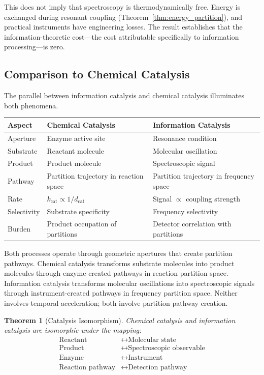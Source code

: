 \documentclass[twocolumn,10pt,a4paper]{article}
\newtheorem{theorem}{Theorem}[section]
\theoremstyle{definition}
\theoremstyle{remark}
\newcommand{\dcat}{d_{\mathrm{cat}}}
\begin{document}
This does not imply that spectroscopy is thermodynamically free. Energy is exchanged during resonant coupling (Theorem~\ref{thm:energy_partition}), and practical instruments have engineering losses. The result establishes that the information-theoretic cost—the cost attributable specifically to information processing—is zero.

\subsection{Comparison to Chemical Catalysis}

The parallel between information catalysis and chemical catalysis illuminates both phenomena.

\begin{center}
\begin{tabular}{lll}
\toprule
\textbf{Aspect} & \textbf{Chemical Catalysis} & \textbf{Information Catalysis} \\
\midrule
Aperture & Enzyme active site & Resonance condition \\
Substrate & Reactant molecule & Molecular oscillation \\
Product & Product molecule & Spectroscopic signal \\
Pathway & Partition trajectory in reaction space & Partition trajectory in frequency space \\
Rate & $k_{\mathrm{cat}} \propto 1/\dcat$ & Signal $\propto$ coupling strength \\
Selectivity & Substrate specificity & Frequency selectivity \\
Burden & Product occupation of partitions & Detector correlation with partitions \\
\bottomrule
\end{tabular}
\end{center}

Both processes operate through geometric apertures that create partition pathways. Chemical catalysis transforms substrate molecules into product molecules through enzyme-created pathways in reaction partition space. Information catalysis transforms molecular oscillations into spectroscopic signals through instrument-created pathways in frequency partition space. Neither involves temporal acceleration; both involve partition pathway creation.

\begin{theorem}[Catalysis Isomorphism]
\label{thm:catalysis_iso}
Chemical catalysis and information catalysis are isomorphic under the mapping:
\begin{align}
\text{Reactant} &\leftrightarrow \text{Molecular state} \\
\text{Product} &\leftrightarrow \text{Spectroscopic observable} \\
\text{Enzyme} &\leftrightarrow \text{Instrument} \\
\text{Reaction pathway} &\leftrightarrow \text{Detection pathway}
\end{align}
\end{theorem}
\end{document}
